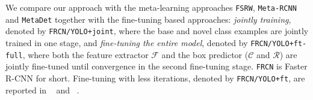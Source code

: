  We compare our approach with the meta-learning approaches \texttt{FSRW}, \texttt{Meta-RCNN} and \texttt{MetaDet} together with the fine-tuning
based approaches:  \emph{jointly training}, denoted by \texttt{FRCN/YOLO+joint}, where the base and novel class examples are jointly trained in one stage,  and \emph{fine-tuning the entire model}, denoted by \texttt{FRCN/YOLO+ft-full}, where both the feature extractor $\mathcal{F}$ and the box predictor ($\mathcal{C}$ and $\mathcal{R}$) are jointly fine-tuned until convergence in the second fine-tuning stage. \texttt{FRCN} is Faster R-CNN for short. Fine-tuning with less iterations, denoted by \texttt{FRCN/YOLO+ft}, are reported in ~\citet{kang2019few} and ~\citet{yan2019meta}.


